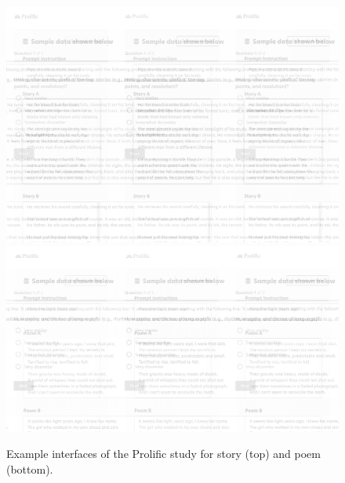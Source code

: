 \begin{figure}[ht]
    \centering
    \includegraphics[width=\linewidth]{figures/appendix/prolific_story.pdf}\\[1em]
    \includegraphics[width=\linewidth]{figures/appendix/prolific_poem.pdf}
    \caption{Example interfaces of the Prolific study for story (top) and poem (bottom).}
    \label{fig:prolific_results}
\end{figure}